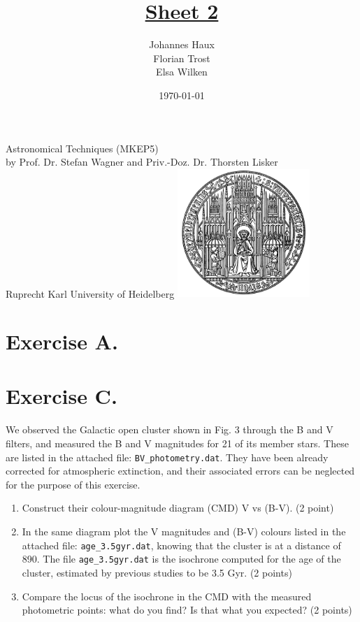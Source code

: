 \documentclass[11pt,a4paper,twoside]{article}
\title{\LARGE \underline {Sheet 2}}
\author{Johannes Haux \\ Florian Trost \\ Elsa Wilken}
\date{\today}
\begin{document}
\maketitle
\thispagestyle{empty}

\begin{center}
  Astronomical Techniques (MKEP5) \\
  \baselineskip35pt
  by Prof. Dr. Stefan Wagner and Priv.-Doz. Dr. Thorsten Lisker \\
  \baselineskip60pt
  Ruprecht Karl University of Heidelberg
\vskip 40pt
\includegraphics[width=5cm]{pic/UniHD.png}

\end{center}

\newpage
\setcounter{page}{1}		%

\section*{Exercise A.} 

\section*{Exercise C.} 
We observed the Galactic open cluster shown in Fig. 3 through the B and V
filters, and measured the B and V magnitudes for 21 of its member stars. These 
are listed in the attached file: \verb+BV_photometry.dat+. They have been 
already corrected for atmospheric extinction, and their associated errors can 
be neglected for the purpose of this exercise.

\begin{enumerate}
\item Construct their colour-magnitude diagram (CMD) V vs (B-V). (2 point)
\item In the same diagram plot the V magnitudes and (B-V) colours listed in the 
attached file: \verb+age_3.5gyr.dat+, knowing that the cluster is at a distance
of \SI{890}{\parsec}. The file \verb+age_3.5gyr.dat+ is the isochrone computed for 
the age of the cluster, estimated by previous studies to be 3.5 Gyr. (2 points)
\item Compare the locus of the isochrone in the CMD with the measured 
photometric points: what do you find? Is that what you expected? (2 points)
\end{enumerate}
\end{document}
